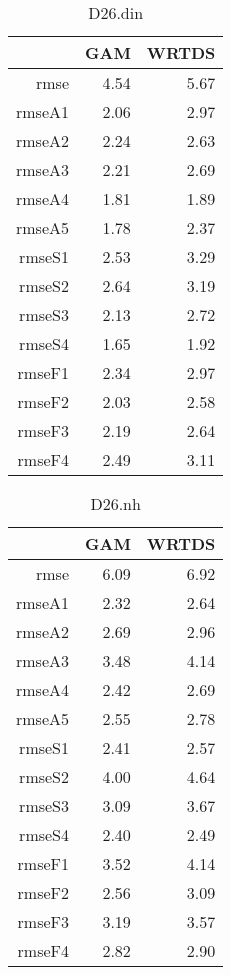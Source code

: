 \documentclass[12pt]{amsart}
\begin{document}
\begin{table}[H]
\centering
\begin{tabular}{rrr}
  \hline
 & GAM & WRTDS \\ 
  \hline
rmse & 4.54 & 5.67 \\ 
  rmseA1 & 2.06 & 2.97 \\ 
  rmseA2 & 2.24 & 2.63 \\ 
  rmseA3 & 2.21 & 2.69 \\ 
  rmseA4 & 1.81 & 1.89 \\ 
  rmseA5 & 1.78 & 2.37 \\ 
  rmseS1 & 2.53 & 3.29 \\ 
  rmseS2 & 2.64 & 3.19 \\ 
  rmseS3 & 2.13 & 2.72 \\ 
  rmseS4 & 1.65 & 1.92 \\ 
  rmseF1 & 2.34 & 2.97 \\ 
  rmseF2 & 2.03 & 2.58 \\ 
  rmseF3 & 2.19 & 2.64 \\ 
  rmseF4 & 2.49 & 3.11 \\ 
   \hline
\end{tabular}
\caption{D26.din}
\end{table}

\begin{table}[H]
\centering
\begin{tabular}{rrr}
  \hline
 & GAM & WRTDS \\ 
  \hline
rmse & 6.09 & 6.92 \\ 
  rmseA1 & 2.32 & 2.64 \\ 
  rmseA2 & 2.69 & 2.96 \\ 
  rmseA3 & 3.48 & 4.14 \\ 
  rmseA4 & 2.42 & 2.69 \\ 
  rmseA5 & 2.55 & 2.78 \\ 
  rmseS1 & 2.41 & 2.57 \\ 
  rmseS2 & 4.00 & 4.64 \\ 
  rmseS3 & 3.09 & 3.67 \\ 
  rmseS4 & 2.40 & 2.49 \\ 
  rmseF1 & 3.52 & 4.14 \\ 
  rmseF2 & 2.56 & 3.09 \\ 
  rmseF3 & 3.19 & 3.57 \\ 
  rmseF4 & 2.82 & 2.90 \\ 
   \hline
\end{tabular}
\caption{D26.nh}
\end{table}
\end{document}
